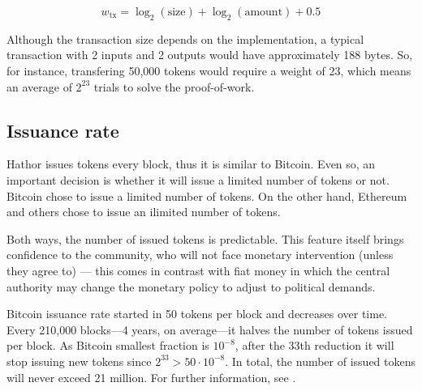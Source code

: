 $$w_\text{tx} = \log_2(\text{size}) + \log_2(\text{amount}) + 0.5$$

Although the transaction size depends on the implementation, a typical transaction with 2 inputs and 2 outputs would have approximately 188 bytes. So, for instance, transfering 50,000 tokens would require a weight of 23, which means an average of $2^{23}$ trials to solve the proof-of-work.


\subsection{Issuance rate}

Hathor issues tokens every block, thus it is similar to Bitcoin. Even so, an important decision is whether it will issue a limited number of tokens or not. Bitcoin chose to issue a limited number of tokens. On the other hand, Ethereum and others chose to issue an ilimited number of tokens.

Both ways, the number of issued tokens is predictable. This feature itself brings confidence to the community, who will not face monetary intervention (unless they agree to) --- this comes in contrast with fiat money in which the central authority may change the monetary policy to adjust to political demands.

Bitcoin issuance rate started in 50 tokens per block and decreases over time. Every 210,000 blocks---4 years, on average---it halves the number of tokens issued per block. As Bitcoin smallest fraction is $10^{-8}$, after the 33th reduction it will stop issuing new tokens since $2^{33} > 50 \cdot 10^{-8}$. In total, the number of issued tokens will never exceed 21 million. For further information, see \cite{bitcoinsupply}.





